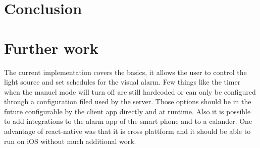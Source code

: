 \documentclass[conference]{IEEEtran}
\begin{document}
\section{Conclusion}


\section{Further work}


The current implementation covers the basics, it allows the user to control the light source and set schedules for the visual alarm. Few things like the timer when the manuel mode will turn off are still hardcoded or can only be configured through a configuration filed used by the server. Those options should be in the future configurable by the client app directly and at runtime. Also it is possible to add integrations to the alarm app of the smart phone and to a calander. One advantage of react-native was that it is cross plattform and it should be able to run on iOS without much additional work.









\end{document}
